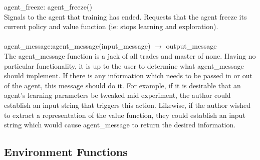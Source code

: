 \documentclass[11pt]{article}
\begin{document}
agent\_freeze: agent\_freeze()\\
Signals to the agent that training has ended. Requests that the agent freeze its current policy and value function (ie: stops learning and exploration).
\\\\
agent\_message:agent\_message(input\_message) $\rightarrow$ output\_message\\
The agent\_message function is a jack of all trades and master of none. Having no particular functionality, it is up to the user to determine what agent\_message should implement. If there is any information which needs to be passed in or out of the agent, this message should do it. For example, if it is desirable that an agent's learning parameters be tweaked mid experiment, the author could establish an input string that triggers this action. Likewise, if the author wished to extract a representation of the value function, they could establish an input string which would cause agent\_message to return the desired information.
                          
\subsection{Environment Functions}
                
\end{document}
